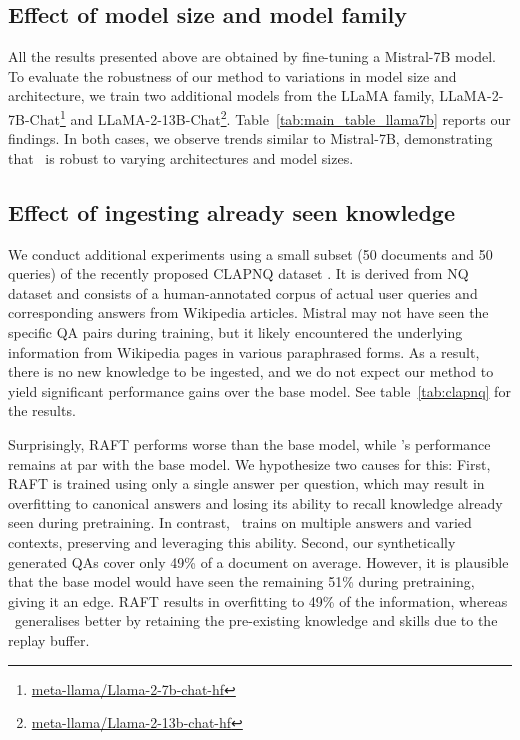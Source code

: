 

\subsection{Effect of model size and model family}
All the results presented above are obtained by fine-tuning a Mistral-7B model.
To evaluate the robustness of our method to variations in model size and architecture, we train two additional models from the LLaMA family, LLaMA-2-7B-Chat\footnote{\href{https://huggingface.co/meta-llama/Llama-2-7b-chat-hf}{meta-llama/Llama-2-7b-chat-hf}} and LLaMA-2-13B-Chat\footnote{\href{https://huggingface.co/meta-llama/Llama-2-13b-chat-hf}{meta-llama/Llama-2-13b-chat-hf}}.
Table~\ref{tab:main_table_llama7b} reports our findings.
In both cases, we observe trends similar to Mistral-7B, demonstrating that \ourmethodshort\ is robust to varying architectures and model sizes.

\subsection{Effect of ingesting already seen knowledge}

\label{subsec:clapnq}
We conduct additional experiments using a small subset (50 documents and 50 queries) of the recently proposed CLAPNQ dataset \citep{rosenthal2025clapnq}.
It is derived from NQ dataset \citep{kwiatkowski2019natural} and consists of a human-annotated corpus of actual user queries and corresponding answers from Wikipedia articles. 
Mistral may not have seen the specific QA pairs during training, but it likely encountered the underlying information from Wikipedia pages in various paraphrased forms.
As a result, there is no new knowledge to be ingested, and we do not expect our method to yield significant performance gains over the base model.
See table~\ref{tab:clapnq} for the results. 

Surprisingly, RAFT performs worse than the base model, while \ourmethodshort's performance remains at par with the base model. 
We hypothesize two causes for this: 
First, RAFT is trained using only a single answer per question, which may result in overfitting to canonical answers and losing its ability to recall knowledge already seen during pretraining. 
In contrast, \ourmethodshort\ trains on multiple answers and varied contexts, preserving and leveraging this ability.
Second, our synthetically generated QAs cover only 49\% of a document on average. However, it is plausible that the base model would have seen the remaining 51\% during pretraining, giving it an edge. RAFT results in overfitting to 49\% of the information, whereas \ourmethodshort\ generalises better by retaining the pre-existing knowledge and skills due to the replay buffer.




